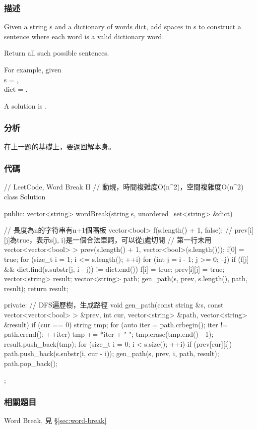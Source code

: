 \subsubsection{描述}
Given a string s and a dictionary of words dict, add spaces in s to construct a sentence where each word is a valid dictionary word.

Return all such possible sentences.

For example, given  \\
s = , \\
dict = .

A solution is .


\subsubsection{分析}
在上一題的基礎上，要返回解本身。


\subsubsection{代碼}
\begin{Code}
// LeetCode, Word Break II
// 動規，時間複雜度O(n^2)，空間複雜度O(n^2)
class Solution {
public:
    vector<string> wordBreak(string s, unordered_set<string> &dict) {
        // 長度為n的字符串有n+1個隔板
        vector<bool> f(s.length() + 1, false);
        // prev[i][j]為true，表示s[j, i)是一個合法單詞，可以從j處切開
        // 第一行未用
        vector<vector<bool> > prev(s.length() + 1, vector<bool>(s.length()));
        f[0] = true;
        for (size_t i = 1; i <= s.length(); ++i) {
            for (int j = i - 1; j >= 0; --j) {
                if (f[j] && dict.find(s.substr(j, i - j)) != dict.end()) {
                    f[i] = true;
                    prev[i][j] = true;
                }
            }
        }
        vector<string> result;
        vector<string> path;
        gen_path(s, prev, s.length(), path, result);
        return result;

    }
private:
    // DFS遍歷樹，生成路徑
    void gen_path(const string &s, const vector<vector<bool> > &prev,
            int cur, vector<string> &path, vector<string> &result) {
        if (cur == 0) {
            string tmp;
            for (auto iter = path.crbegin(); iter != path.crend(); ++iter)
                tmp += *iter + " ";
            tmp.erase(tmp.end() - 1);
            result.push_back(tmp);
        }
        for (size_t i = 0; i < s.size(); ++i) {
            if (prev[cur][i]) {
                path.push_back(s.substr(i, cur - i));
                gen_path(s, prev, i, path, result);
                path.pop_back();
            }
        }
    }
};
\end{Code}


\subsubsection{相關題目}
\begindot
\item Word Break, 見 \S \ref{sec:word-break}
\myenddot
